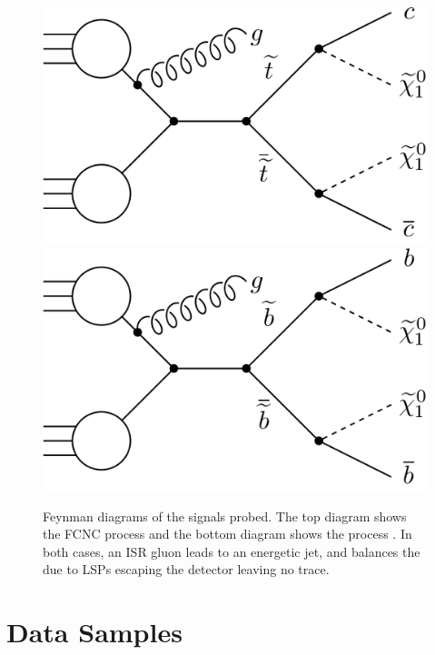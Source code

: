\begin{figure}[!Hhtb]
  \begin{center}
 \includegraphics[scale=0.4]{Figures/sus13009/t2cc.pdf}
 \includegraphics[scale=0.4]{Figures/sus13009/t2bb.pdf}
  \caption{Feynman diagrams of the signals probed. The top diagram shows the \ac{FCNC} process \ttwocc and the bottom diagram shows the process \ttwobb. In both cases, an \ac{ISR} gluon leads to an energetic jet, and balances the \MET due to \ac{LSP}s escaping the detector leaving no trace.}
           \label{fig:feynmandiagrams}
  \end{center}
\end{figure}




\section{Data Samples}
\label{sec:data}

